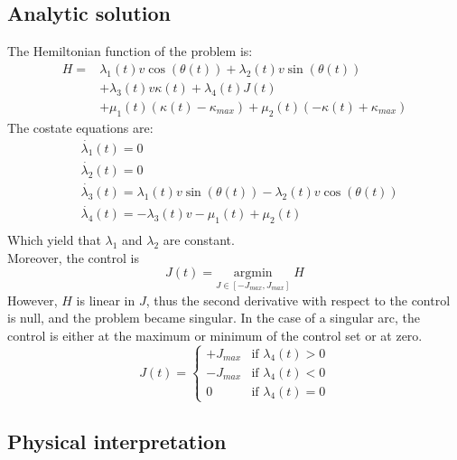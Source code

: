 \documentclass[11pt,twocolumn]{scrartcl}
\begin{document}
\subsection*{Analytic solution}
%
The Hemiltonian function of the problem is:
%
\begin{equation}
  \begin{split}
    H = &\lambda_1(t) v \cos(\theta(t)) + \lambda_2(t) v \sin(\theta(t)) \\
        &+ \lambda_3(t) v \kappa(t) + \lambda_4(t) J(t)\\
        &+ \mu_1(t) (\kappa(t)-\kappa_{max}) + \mu_2(t) (-\kappa(t)+\kappa_{max})
  \end{split}
\end{equation}
%
The costate equations are:
%
\begin{equation}
  \begin{split}
    &\dot{\lambda_1}(t) = 0 \\
    &\dot{\lambda_2}(t) = 0 \\
    &\dot{\lambda_3}(t) = \lambda_1(t) v \sin(\theta(t)) - \lambda_2(t) v \cos(\theta(t)) \\
    &\dot{\lambda_4}(t) = -\lambda_3(t) v -\mu_1(t) + \mu_2(t) \\
  \end{split}
\end{equation}
%
Which yield that $\lambda_1$ and $\lambda_2$ are constant.\\
Moreover, the control is
%
\begin{equation}
  J(t) = \underset{ J \in [-J_{max},J_{max}]}{ \textrm{argmin} } \; H 
\end{equation}
%
However, $H$ is linear in $J$, thus the second derivative with respect to the control is null, and the problem became singular. In the case of a singular arc, the control is either at the maximum or minimum of the control set or at zero.
%
\begin{equation}
  J(t) = \begin{cases}
    +J_{max} & \text{if } \lambda_4(t) > 0 \\
    -J_{max} & \text{if } \lambda_4(t) < 0 \\
    0 & \text{if } \lambda_4(t) = 0
  \end{cases}
\end{equation}
%
\subsection*{Physical interpretation}
\end{document}
